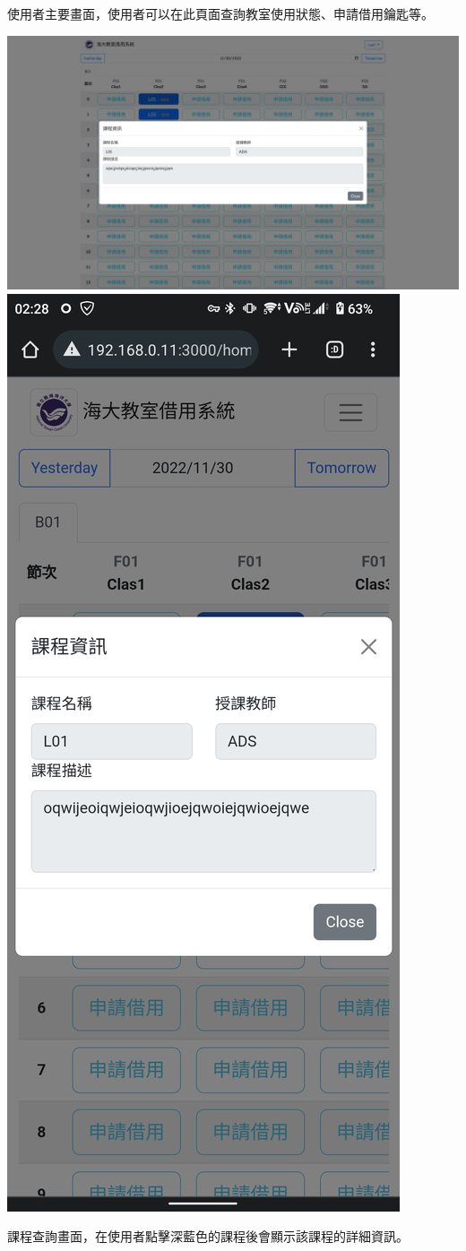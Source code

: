 \documentclass{article}
\begin{document}
使用者主要畫面，使用者可以在此頁面查詢教室使用狀態、申請借用鑰匙等。

\vfill


\begin{center}
	\includegraphics[width=0.7\linewidth]{HomeLessonInfoPage.png}
	\includegraphics[width=0.2\linewidth]{HomeLessonInfoPhone.png}
\end{center}

課程查詢畫面，在使用者點擊深藍色的課程後會顯示該課程的詳細資訊。

\pagebreak
\end{document}
